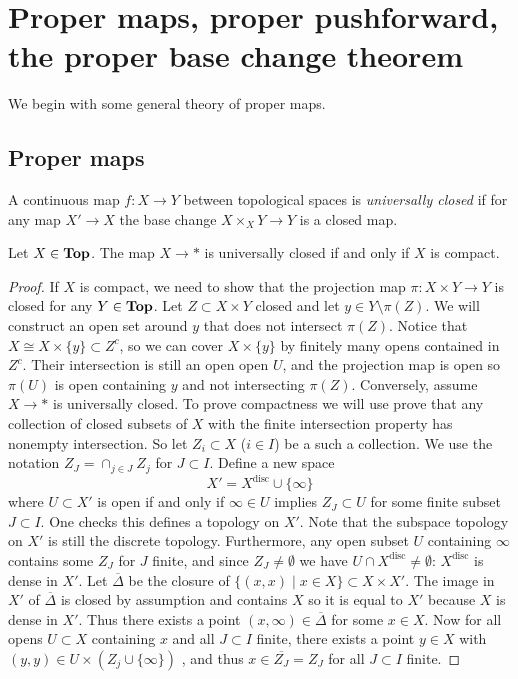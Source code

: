 \chapter{Proper maps, proper pushforward, the proper base change theorem}

We begin with some general theory of proper maps. 

\section{Proper maps}

\begin{defn}
	A continuous map $f: X \to Y$ between topological spaces is \emph{universally closed} if for any map $X' \to X$ the base change $X \times_X Y \to Y$ is a closed map.
\end{defn}

\begin{lem}
	Let $X \in \mathbf{Top}$. The map $X \to *$ is universally closed if and only if $X$ is compact. 
\end{lem}
\begin{proof}
	If $X$ is compact, we need to show that the projection map $\pi: X\times Y \to Y$ is closed for any $Y \in \mathbf{Top}$. Let $Z \subset X \times Y$ closed and let $y \in Y \setminus \pi(Z)$. We will construct an open set around $y$ that does not intersect $\pi(Z)$. 
	Notice that $X \cong X \times \{y\} \subset Z^{c}$, so we can cover $X \times \{y\}$ by finitely many opens contained in $Z^c$. Their intersection is still an open open $U$, and the projection map is open so $\pi(U)$ is open containing $y$ and not intersecting $\pi(Z)$. 
	Conversely, assume $X \to *$ is universally closed.
	To prove compactness we will use prove that any collection of closed subsets of $X$ with the finite intersection property has nonempty intersection. So let $Z_i \subset X$ ($i \in I$) be a such a collection. We use the notation $Z_J = \cap_{j \in J}Z_j$ for $J \subset I$.
	Define a new space \[
    	X' = X^{\text{disc}} \cup \{\infty\}
    \] where $U \subset X'$ is open if and only if $\infty \in U$ implies $Z_J \subset U$ for some finite subset $J \subset I$.
	One checks this defines a topology on $X'$. Note that the subspace topology on $X'$ is still the discrete topology. Furthermore, any open subset $U$ containing $\infty$ contains some $Z_J$ for $J$ finite, and since $Z_J \neq \emptyset$ we have $U \cap X^\text{disc} \neq \emptyset$: $X^{\text{disc}}$ is dense in $X'$. Let $\overline{\Delta}$ be the closure of $\{(x,x) \mid x \in X\} \subset X \times X'$. The image in $X'$ of $\overline{\Delta}$ is closed by assumption and contains $X$ so it is equal to $X'$ because $X$ is dense in $X'$. Thus there exists a point $(x, \infty) \in \overline{\Delta}$ for some $x \in X$. Now for all opens $U \subset X$ containing $x$ and all $J \subset I$ finite, there exists a point $y \in X$ with $(y, y) \in U \times (Z_j \cup \{\infty\})$ , and thus $x \in \overline{Z_J} = Z_J$ for all $J \subset I$ finite.
\end{proof}

